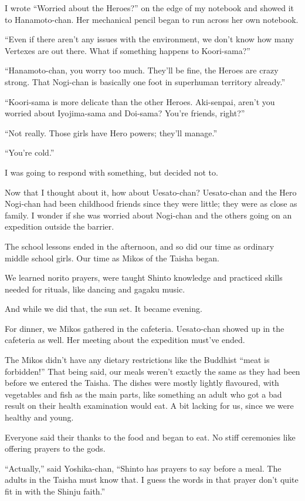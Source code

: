 I wrote ``Worried about the Heroes?'' on the edge of my notebook and showed it to Hanamoto-chan. Her mechanical pencil began to run across her own notebook.

``Even if there aren't any issues with the environment, we don't know how many Vertexes are out there. What if something happens to Koori-sama?''

``Hanamoto-chan, you worry too much. They'll be fine, the Heroes are crazy strong. That Nogi-chan is basically one foot in superhuman territory already.''

``Koori-sama is more delicate than the other Heroes. Aki-senpai, aren't you worried about Iyojima-sama and Doi-sama? You're friends, right?''

``Not really. Those girls have Hero powers; they'll manage.''

``You're cold.''

I was going to respond with something, but decided not to.

Now that I thought about it, how about Uesato-chan? Uesato-chan and the Hero Nogi-chan had been childhood friends since they were little; they were as close as family. I wonder if she was worried about Nogi-chan and the others going on an expedition outside the barrier.

The school lessons ended in the afternoon, and so did our time as ordinary middle school girls. Our time as Mikos of the Taisha began.

We learned norito prayers, were taught Shinto knowledge and practiced skills needed for rituals, like dancing and gagaku music.

And while we did that, the sun set. It became evening.

For dinner, we Mikos gathered in the cafeteria. Uesato-chan showed up in the cafeteria as well. Her meeting about the expedition must've ended.

The Mikos didn't have any dietary restrictions like the Buddhist ``meat is forbidden!'' That being said, our meals weren't exactly the same as they had been before we entered the Taisha. The dishes were mostly lightly flavoured, with vegetables and fish as the main parts, like something an adult who got a bad result on their health examination would eat. A bit lacking for us, since we were healthy and young.

Everyone said their thanks to the food and began to eat. No stiff ceremonies like offering prayers to the gods.

``Actually,'' said Yoshika-chan, ``Shinto has prayers to say before a meal. The adults in the Taisha must know that. I guess the words in that prayer don't quite fit in with the Shinju faith.''

